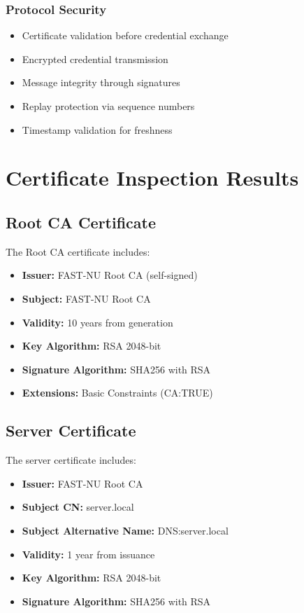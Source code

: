 \documentclass[runningheads]{llncs}
\begin{document}
\subsubsection{Protocol Security}

\begin{itemize}
    \item Certificate validation before credential exchange
    \item Encrypted credential transmission
    \item Message integrity through signatures
    \item Replay protection via sequence numbers
    \item Timestamp validation for freshness
\end{itemize}

\section{Certificate Inspection Results}

\subsection{Root CA Certificate}

The Root CA certificate includes:
\begin{itemize}
    \item \textbf{Issuer:} FAST-NU Root CA (self-signed)
    \item \textbf{Subject:} FAST-NU Root CA
    \item \textbf{Validity:} 10 years from generation
    \item \textbf{Key Algorithm:} RSA 2048-bit
    \item \textbf{Signature Algorithm:} SHA256 with RSA
    \item \textbf{Extensions:} Basic Constraints (CA:TRUE)
\end{itemize}

\subsection{Server Certificate}

The server certificate includes:
\begin{itemize}
    \item \textbf{Issuer:} FAST-NU Root CA
    \item \textbf{Subject CN:} server.local
    \item \textbf{Subject Alternative Name:} DNS:server.local
    \item \textbf{Validity:} 1 year from issuance
    \item \textbf{Key Algorithm:} RSA 2048-bit
    \item \textbf{Signature Algorithm:} SHA256 with RSA
\end{itemize}
\end{document}
